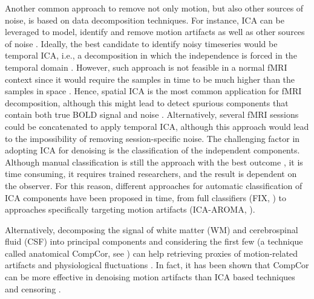 Another common approach to remove not only motion, but also other sources of
noise, is based on data decomposition techniques. For instance, ICA can be
leveraged to model, identify and remove motion artifacts as well as other
sources of noise
\citep{Behzadi2007componentbasednoise,Griffanti2014ICAbasedartifact,Muschelli2014Reductionmotionrelated,Pruim2015ICAAROMArobust,Pruim2015EvaluationICAAROMA,SalimiKhorshidi2014Automaticdenoisingfunctional}.
Ideally, the best candidate to identify noisy timeseries would be temporal ICA,
i.e., a decomposition in which the independence is forced in the temporal domain
\citep{Glasser2018UsingtemporalICA,Smith2012Temporallyindependentfunctional}.
However, such approach is not feasible in a normal fMRI context since it would
require the samples in time to be much higher than the samples in space
\citep{Smith2012Temporallyindependentfunctional}. Hence, spatial ICA is the most
common application for fMRI decomposition, although this might lead to detect
spurious components that contain both true BOLD signal and noise
\citep{CaballeroGaudes2017MethodscleaningBOLD}. Alternatively, several fMRI
sessions could be concatenated to apply temporal ICA, although this approach
would lead to the impossibility of removing session-specific noise. The
challenging factor in adopting ICA for denoising is the classification of the
independent components. Although manual classification is still the approach
with the best outcome \citep{Griffanti2017HandclassificationfMRI}, it is time
consuming, it requires trained researchers, and the result is dependent on the
observer. For this reason, different approaches for automatic classification of
ICA components have been proposed in time, from full classifiers (FIX,
\cite{SalimiKhorshidi2014Automaticdenoisingfunctional}) to approaches
specifically targeting motion artifacts (ICA-AROMA,
\cite{Pruim2015ICAAROMArobust,Pruim2015EvaluationICAAROMA}).

Alternatively, decomposing the signal of white matter (WM) and
cerebrospinal fluid (CSF) into principal components and considering
the first few (a technique called anatomical CompCor, see
\cite{Behzadi2007componentbasednoise}) can help retrieving proxies of
motion-related artifacts and physiological fluctuations
\citep{Behzadi2007componentbasednoise,Muschelli2014Reductionmotionrelated}. In
fact, it has been shown that CompCor can be more effective in denoising motion
artifacts than ICA based techniques and censoring
\citep{Mascali2021Evaluationdenoisingstrategies}.

